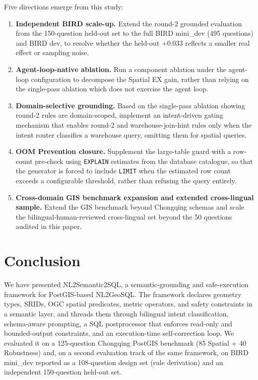 \documentclass[11pt]{article}
\begin{document}
Five directions emerge from this study:
\begin{enumerate}[leftmargin=*]
  \item \textbf{Independent BIRD scale-up.} Extend the round-2 grounded evaluation from the 150-question held-out set to the full BIRD mini\_dev (495 questions) and BIRD dev, to resolve whether the held-out $+0.033$ reflects a smaller real effect or sampling noise.
  \item \textbf{Agent-loop-native ablation.} Run a component ablation under the agent-loop configuration to decompose the Spatial EX gain, rather than relying on the single-pass ablation which does not exercise the agent loop.
  \item \textbf{Domain-selective grounding.} Based on the single-pass ablation showing round-2 rules are domain-scoped, implement an intent-driven gating mechanism that enables round-2 and warehouse-join-hint rules only when the intent router classifies a warehouse query, omitting them for spatial queries.
  \item \textbf{OOM Prevention closure.} Supplement the large-table guard with a row-count pre-check using \texttt{EXPLAIN} estimates from the database catalogue, so that the generator is forced to include \texttt{LIMIT} when the estimated row count exceeds a configurable threshold, rather than refusing the query entirely.
  \item \textbf{Cross-domain GIS benchmark expansion and extended cross-lingual sample.} Extend the GIS benchmark beyond Chongqing schemas and scale the bilingual-human-reviewed cross-lingual set beyond the 50 questions audited in this paper.
\end{enumerate}

\section{Conclusion}
\label{sec:conclusion}

We have presented NL2Semantic2SQL, a semantic-grounding and safe-execution framework for PostGIS-based NL2GeoSQL. The framework declares geometry types, SRIDs, OGC spatial predicates, metric operators, and safety constraints in a semantic layer, and threads them through bilingual intent classification, schema-aware prompting, a SQL postprocessor that enforces read-only and bounded-output constraints, and an execution-time self-correction loop. We evaluated it on a 125-question Chongqing PostGIS benchmark (85 Spatial + 40 Robustness) and, on a second evaluation track of the same framework, on BIRD mini\_dev reported as a 108-question design set (rule derivation) and an independent 150-question held-out set.
\end{document}
